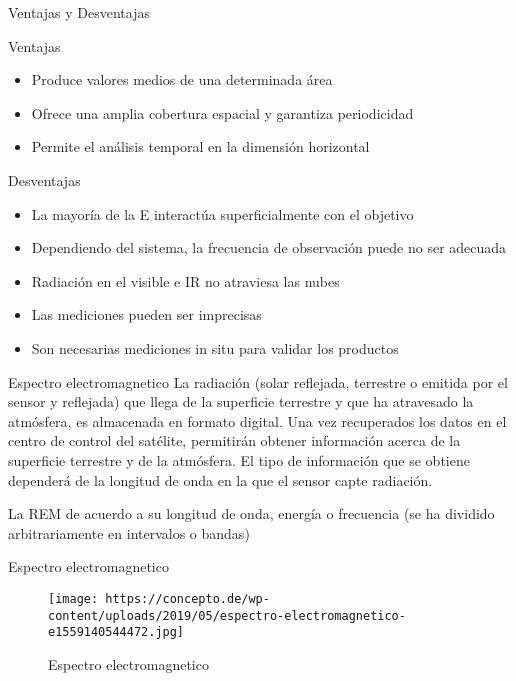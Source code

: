 \documentclass[
  ignorenonframetext,
]{beamer}
\providecommand{\tightlist}{%
  \setlength{\itemsep}{0pt}\setlength{\parskip}{0pt}}
\begin{document}
\begin{frame}{Ventajas y Desventajas}
\protect\hypertarget{ventajas-y-desventajas}{}
\begin{block}{Ventajas}
\protect\hypertarget{ventajas}{}
\begin{itemize}
\tightlist
\item
  Produce valores medios de una determinada área
\item
  Ofrece una amplia cobertura espacial y garantiza periodicidad
\item
  Permite el análisis temporal en la dimensión horizontal
\end{itemize}
\end{block}

\begin{block}{Desventajas}
\protect\hypertarget{desventajas}{}
\begin{itemize}
\tightlist
\item
  La mayoría de la E interactúa superficialmente con el objetivo
\item
  Dependiendo del sistema, la frecuencia de observación puede no ser
  adecuada
\item
  Radiación en el visible e IR no atraviesa las nubes
\item
  Las mediciones pueden ser imprecisas
\item
  Son necesarias mediciones in situ para validar los productos
\end{itemize}
\end{block}
\end{frame}

\begin{frame}{Espectro electromagnetico}
\protect\hypertarget{espectro-electromagnetico}{}
La radiación (solar reflejada, terrestre o emitida por el sensor y
reflejada) que llega de la superficie terrestre y que ha atravesado la
atmósfera, es almacenada en formato digital. Una vez recuperados los
datos en el centro de control del satélite, permitirán obtener
información acerca de la superficie terrestre y de la atmósfera. El tipo
de información que se obtiene dependerá de la longitud de onda en la que
el sensor capte radiación.

La REM de acuerdo a su longitud de onda, energía o frecuencia (se ha
dividido arbitrariamente en intervalos o bandas)
\end{frame}

\begin{frame}{Espectro electromagnetico}
\protect\hypertarget{espectro-electromagnetico-1}{}
\begin{figure}
\centering
\texttt{[image: https://concepto.de/wp-content/uploads/2019/05/espectro-electromagnetico-e1559140544472.jpg]}
\caption{Espectro electromagnetico}
\end{figure}
\end{frame}
\end{document}
